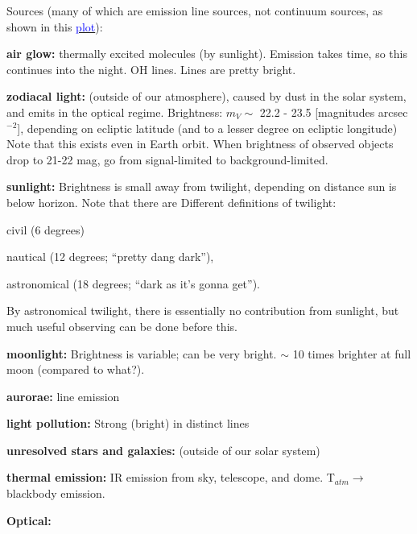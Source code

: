 \documentclass[12pt]{article}
\begin{document}
Sources
(many of which are emission line sources, not continuum
sources, as shown in this
\href{http://astronomy.nmsu.edu/holtz/a535/html/diagrams/a535/skyemiss.htm}
{\textcolor{blue}{plot}}):
\begin{itemize*}
    \item \textbf{air glow:} thermally excited molecules (by sunlight).
        Emission takes time, so this continues into the night.
        OH lines. Lines are pretty bright.
    \item \textbf{zodiacal light:}
        (outside of our atmosphere), caused by dust in the solar system,
        and emits in the optical regime.
        Brightness: $m_V \sim$ 22.2 - 23.5 [magnitudes arcsec$^{-2}$],
        depending on ecliptic latitude
        (and to a lesser degree on ecliptic longitude)
        Note that this exists even in Earth orbit.
        When brightness of observed objects drop to 21-22 mag,
        go from signal-limited to background-limited.
    \item \textbf{sunlight:} Brightness is
        small away from twilight, depending on distance sun is below horizon. Note that there are
        Different definitions of twilight:
        \begin{itemize*}
            \item civil (6 degrees)
            \item nautical (12 degrees; ``pretty dang dark''),
            \item astronomical (18 degrees; ``dark as it's gonna get'').
        \end{itemize*}
        By astronomical twilight, there is essentially no contribution
        from sunlight, but much useful observing can be done before this.
    \item \textbf{moonlight:} Brightness is variable; can be very bright.
        $\sim$ 10 times brighter at full moon (compared to what?).
    \item \textbf{aurorae:} line emission
    \item \textbf{light pollution:} Strong (bright) in distinct lines
    \item \textbf{unresolved stars and galaxies:}
        (outside of our solar system)
    \item \textbf{thermal emission:} IR emission from sky,
        telescope, and dome.
        T$_{atm} \rightarrow$ blackbody emission.
\end{itemize*}

\textbf{Optical:}
\end{document}
